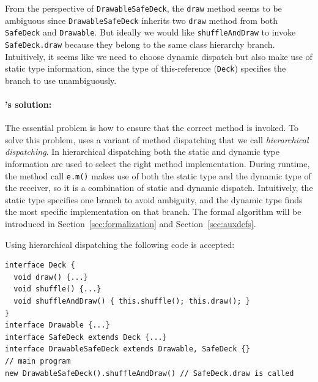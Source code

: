 From the perspective of \lstinline|DrawableSafeDeck|, the \lstinline|draw| method seems to be ambiguous since \lstinline|DrawableSafeDeck| inherits two \lstinline|draw| method from both \lstinline|SafeDeck| and \lstinline|Drawable|. But ideally we would
like \lstinline|shuffleAndDraw| to invoke \lstinline|SafeDeck.draw|
because they belong to the same class hierarchy branch. Intuitively, it 
seems like we need to choose dynamic dispatch but also make use of static type
information, since the type of this-reference (\lstinline|Deck|)
specifies the branch to use unambiguously.


\paragraph{\MIM's solution:} 
The essential problem is how to ensure that the correct method is
invoked. To solve this problem, \MIM{} uses a variant of method
dispatching that we call \textit{hierarchical dispatching}. In
hierarchical dispatching both the static and dynamic type information 
are used to select the right method implementation.
During runtime, the method call \lstinline|e.m()|
makes use of both the static type and the dynamic type of the
receiver, so it is a
combination of static and dynamic dispatch. Intuitively, the static type specifies one branch
to avoid ambiguity, and the dynamic type finds the most specific implementation on that branch. The formal algorithm will be introduced in Section~\ref{sec:formalization} and Section~\ref{sec:auxdefs}.

\noindent Using hierarchical dispatching the following code is accepted:
\vspace{3pt}\begin{lstlisting}
interface Deck {
  void draw() {...}
  void shuffle() {...}
  void shuffleAndDraw() { this.shuffle(); this.draw(); }
}
interface Drawable {...}
interface SafeDeck extends Deck {...}
interface DrawableSafeDeck extends Drawable, SafeDeck {}
// main program
new DrawableSafeDeck().shuffleAndDraw() // SafeDeck.draw is called
\end{lstlisting}\vspace{3pt}

